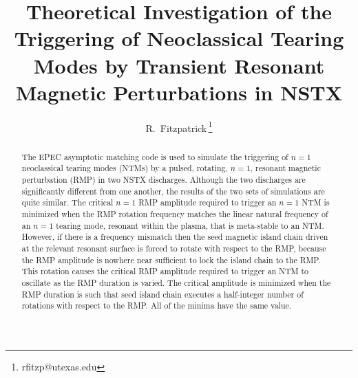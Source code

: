 \documentclass[12pt,prb,aps]{revtex4-1}
\begin{document}
\title{Theoretical Investigation of the Triggering of Neoclassical Tearing Modes by Transient Resonant Magnetic Perturbations in NSTX}
\author{R.~Fitzpatrick\,\footnote{rfitzp@utexas.edu}}

\begin{abstract}
The EPEC asymptotic matching code is used to simulate the triggering of $n=1$ neoclassical tearing modes (NTMs) by a pulsed, 
rotating, $n=1$, resonant magnetic perturbation (RMP)  in
two NSTX discharges. Although the two discharges are significantly different from one another, the results of the two sets of simulations are quite similar. The critical $n=1$ RMP  amplitude required to
trigger an $n=1$ NTM is minimized when the RMP rotation frequency matches the linear natural frequency of an $n=1$  tearing mode, resonant within the plasma, that is meta-stable to an NTM. However, if there is a frequency mismatch then the seed magnetic island chain driven at the relevant resonant surface is forced to rotate with respect to the RMP, because the RMP amplitude is nowhere near sufficient to lock the island chain to the RMP.  
This rotation causes the critical RMP amplitude required to trigger an NTM to oscillate as the RMP duration is varied. The critical amplitude is
minimized when the RMP duration is such that  seed island chain executes a half-integer number of rotations with respect to the RMP. All of the minima have the same value. 
\end{abstract}

\maketitle
\end{document}
